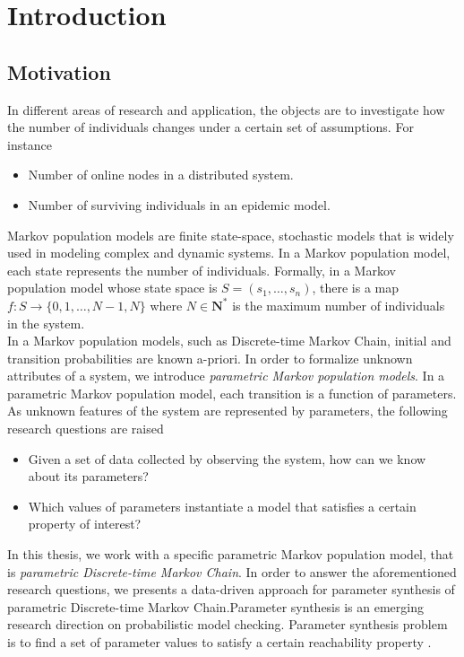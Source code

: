 \chapter{Introduction}
\section{Motivation}

In different areas of research and application, the objects are to investigate how the number of
individuals changes under a certain set of assumptions. For instance
\begin{itemize}
      \item Number of online nodes in a distributed system.
      \item Number of surviving individuals in an epidemic model.
\end{itemize}
Markov population models \cite{kingman1969markov} are finite state-space, stochastic models that is
widely used in modeling complex and dynamic systems. In a Markov population model, each state
represents the number of individuals. Formally, in a Markov population model whose state space is
$S=(s_1,\ldots,s_n)$, there is a map $f:S\rightarrow\{0,1,\ldots,N-1,N\}$ where $N\in\mathbf{N}^*$
is the maximum number of individuals in the system.\\
In a Markov population models, such as Discrete-time Markov Chain, initial and transition
probabilities are known a-priori. In order to formalize unknown attributes of a system, we introduce
\textit{parametric Markov population models}. In a parametric Markov population model, each
transition is a function of parameters. As unknown features of the system are represented by
parameters, the following research questions are raised
\begin{itemize}
      \item Given a set of data collected by observing the system, how can we know about its
            parameters?
      \item Which values of parameters instantiate a model that satisfies a certain property of
            interest?
\end{itemize}
In this thesis, we work with a specific parametric Markov population model, that is
\textit{parametric Discrete-time Markov Chain}. In order to answer the aforementioned research
questions, we presents a data-driven approach for parameter synthesis of parametric Discrete-time
Markov Chain.Parameter synthesis is an emerging research direction on probabilistic model checking.
Parameter synthesis problem is to find a set of parameter values to satisfy a certain reachability
property \cite{katoen2016probabilistic}.

